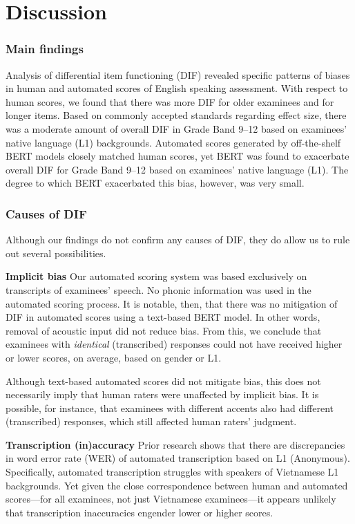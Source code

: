 \documentclass [PhD] {uclathes}
\begin{document}
\chapter{Discussion}

\subsection{Main findings}

Analysis of differential item functioning (DIF) revealed specific patterns of biases in human and automated scores of English speaking assessment. With respect to human scores, we found that there was more DIF for older examinees and for longer items. Based on commonly accepted standards regarding effect size, there was a moderate amount of overall DIF in Grade Band 9–12 based on examinees’ native language (L1) backgrounds. Automated scores generated by off-the-shelf BERT models closely matched human scores, yet BERT was found to exacerbate overall DIF for Grade Band 9–12 based on examinees’ native language (L1). The degree to which BERT exacerbated this bias, however, was very small.

\subsection{Causes of DIF}

Although our findings do not confirm any causes of DIF, they do allow us to rule out several possibilities. 

\noindent \textbf{Implicit bias} \;
Our automated scoring system was based exclusively on transcripts of examinees’ speech. No phonic information was used in the automated scoring process. It is notable, then, that there was no mitigation of DIF in automated scores using a text-based BERT model. In other words, removal of acoustic input did not reduce bias. From this, we conclude that examinees with \emph{identical} (transcribed) responses could not have received higher or lower scores, on average, based on gender or L1. 

Although text-based automated scores did not mitigate bias, this does not necessarily imply that human raters were unaffected by implicit bias. It is possible, for instance, that examinees with different accents also had different (transcribed) responses, which still affected human raters' judgment. 

\noindent \textbf{Transcription (in)accuracy} \;
Prior research shows that there are discrepancies in word error rate (WER) of automated transcription based on L1 (Anonymous). Specifically, automated transcription struggles with speakers of Vietnamese L1 backgrounds. Yet given the close correspondence between human and automated scores—for all examinees, not just Vietnamese examinees—it appears unlikely that transcription inaccuracies engender lower or higher scores. 
\end{document}
